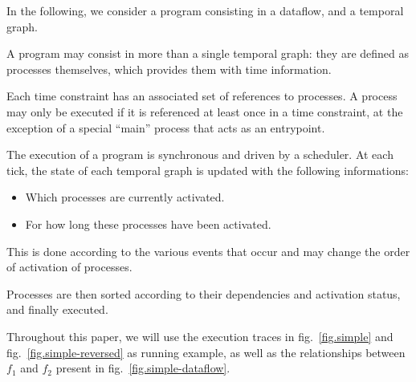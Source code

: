 \documentclass{article}
\begin{document}
In the following, we consider a program consisting in a dataflow, and a temporal graph.
    
A program may consist in more than a single temporal graph: they are defined as processes themselves, which provides them with time information.
    
Each time constraint has an associated set of references to processes.
A process may only be executed if it is referenced at least once in a time constraint, 
at the exception of a special ``main'' process that acts as an entrypoint.
    
The execution of a program is synchronous and driven by a scheduler.
At each tick, the state of each temporal graph is updated with the following informations:
    
\begin{itemize}
  \item Which processes are currently activated.
  \item For how long these processes have been activated.
\end{itemize}

This is done according to the various events that occur and may change the order of activation of processes.

Processes are then sorted according to their dependencies and activation status, and finally executed.
    

    
Throughout this paper, we will use the execution traces in fig.~\ref{fig.simple} and fig.~\ref{fig.simple-reversed} as running example, as well as the relationships between $f_1$ and $f_2$ present in fig.~\ref{fig.simple-dataflow}. 
    
\end{document}
